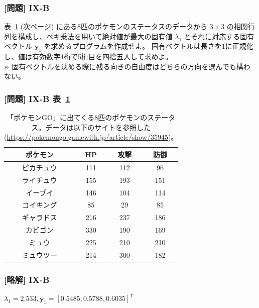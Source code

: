 \documentclass[dvipdfmx,aspectratio=169,20pt]{beamer}
\newcommand{\myfontsetting}[3]{{\fontsize{#1}{#2}\selectfont #3}}
\begin{document}
\begin{frame}
\frametitle{[問題] I\hspace{-.1em}X-B}

\myfontsetting{18pt}{18pt}{
表~\ref{table:pokemon_go}
\myfontsetting{12pt}{12pt}{(次ページ)}
にある8匹のポケモンのステータスのデータから $3\times 3$ の相関行列を構成し、ベキ乗法を用いて絶対値が最大の固有値 $\lambda_1$ とそれに対応する固有ベクトル $\bm{y}_1$ を求めるプログラムを作成せよ。
固有ベクトルは長さを1に正規化し、値は有効数字4桁で5桁目を四捨五入して求めよ。%
}\\
\myfontsetting{10pt}{10pt}{
※ 固有ベクトルを決める際に残る向きの自由度はどちらの方向を選んでも構わない。
}
\end{frame}
\begin{frame}
\frametitle{[問題] I\hspace{-.1em}X-B 表~\ref{table:pokemon_go}}

\myfontsetting{12pt}{12pt}{
\begin{table}[htbp]
    \centering
\begin{tabular}{|c||c|c|c|}
\hline
ポケモン & HP & 攻撃 & 防御\\
\hline
ピカチュウ  & 111 & 112 & 96\\
ライチュウ  & 155 & 193 & 151\\
イーブイ	& 146 & 104 & 114\\
コイキング	& 85 & 29 & 85\\
ギャラドス	& 216& 237 & 186\\
カビゴン	& 330 & 190 & 169\\
ミュウ	    & 225 &210 & 210\\
ミュウツー	& 214 & 300 & 182\\
\hline
\end{tabular}
\caption{
\myfontsetting{10pt}{10pt}{
「ポケモンGO」に出てくる8匹のポケモンのステータス。データは以下のサイトを参照した (\url{https://pokemongo.gamewith.jp/article/show/35945})。\label{table:pokemon_go}}
}
\end{table}
}
\end{frame}
\begin{frame}
\frametitle{[略解] I\hspace{-.1em}X-B}

$\lambda_1 = 2.533,\bm{y}_1 = [ 0.5485, 0.5788, 0.6035]^\mathsf{T}$

\end{frame}
\end{document}
